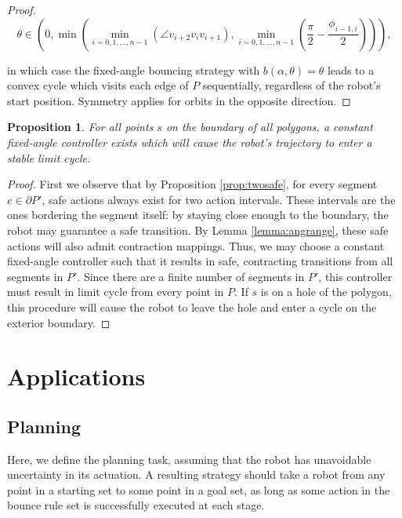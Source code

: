 \documentclass[]{article}
\newtheorem{proposition}{Proposition}
\begin{document}
\begin{proof}
\begin{equation*}
\theta \in (0, \min(\min_{i = 0, 1, \dots, n-1}(\angle v_{i+2}v_{i}v_{i+1}),
\min_{i = 0, 1, \dots, n-1}(\frac{\pi}{2}-\frac{\phi_{i-1, i}}{2}))),
\end{equation*}

\noindent
in which case the fixed-angle bouncing strategy with $b(\alpha, \theta) = \theta$ leads to a convex
cycle which visits each edge of $P$ sequentially, regardless of the robot's start position.
Symmetry applies for orbits in the opposite direction.

\end{proof}

\begin{proposition} \label{prop:cycle}
For all points $s$ on the boundary of all polygons, a constant
fixed-angle controller exists which will cause the robot's trajectory to enter a
stable limit cycle.
\end{proposition}

\begin{proof}
First we observe that by Proposition \ref{prop:twosafe}, for every segment $e
\in \partial P'$, 
safe actions always exist
for two action intervals. These intervals are the ones bordering the segment itself:
by staying close enough to the boundary, the robot may guarantee a safe
transition. By Lemma \ref{lemma:angrange}, these safe actions will also
admit contraction mappings. Thus, we may choose a constant fixed-angle
controller such that it results in safe, contracting transitions from all
segments in $P'$. Since there are a finite number of segments in $P'$, this
controller must result in limit cycle from every point in $P$. If $s$ is on a
hole of the polygon, this procedure will cause the robot to leave the hole and
enter a cycle on the exterior boundary.
\end{proof}

\section{Applications}

\subsection{Planning}

Here, we define the planning task, assuming that
the robot has unavoidable uncertainty in its actuation. 
A resulting strategy should take a robot
from any point in a starting set to some point in a goal set, as long as some
action in the bounce rule set is successfully executed at each stage. 
\end{document}
